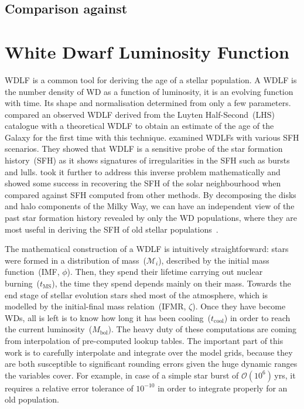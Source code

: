 \documentclass[fleqn,usenatbib]{rasti}
\begin{document}
\subsection{Comparison against \citet{2021MNRAS.508.3877G}}




\section{White Dwarf Luminosity Function}
WDLF is a common tool for deriving the age of a stellar population. A WDLF is
the number density of WD as a function of luminosity, it is an evolving
function with time. Its shape and normalisation determined from only a few
parameters. \citet{1987ApJ...315L..77W} compared an observed WDLF derived from
the Luyten Half-Second~(LHS) catalogue with a theoretical WDLF to obtain an
estimate of the age of the Galaxy for the first time with this technique.
\citet{1990ApJ...352..605N} examined WDLFs with various SFH scenarios. They
showed that WDLF is a sensitive probe of the star formation history~(SFH) as
it shows signatures of irregularities in the SFH such as bursts and lulls.
\citet{2013MNRAS.434.1549R} took it further to address this inverse problem
mathematically and showed some success in recovering the SFH of the solar
neighbourhood when compared against SFH computed from other methods. By
decomposing the disks and halo components of the Milky Way, we can have an
independent view of the past star formation history revealed by only the
WD populations, where they are most useful in deriving the SFH of old
stellar populations~\citep{2011MNRAS.417...93R, 2017ASPC..509...25L}.


The mathematical construction of a WDLF is intuitively straightforward: stars
were formed in a distribution of mass~($\mathcal{M}_i$), described by the initial
mass function~(IMF, $\phi$). Then, they spend their lifetime carrying out
nuclear burning~($t_{\mathrm{MS}}$), the time they spend depends mainly on
their mass. Towards the end stage of stellar evolution stars shed most of the
atmosphere, which is modelled by the initial-final mass relation~(IFMR,
$\zeta$). Once they have become WDs, all is left is to know how long it has
been cooling~($t_{\mathrm{cool}}$) in order to reach the current
luminosity~($M_\mathrm{bol}$). The heavy duty of these computations
are coming from interpolation of pre-computed lookup tables. The important
part of this work is to carefully interpolate and integrate over the model
grids, because they are both susceptible to significant rounding errors given
the huge dynamic ranges the variables cover. For example, in case of a simple
star burst of $\mathcal{O}(10^6)$\,yrs, it requires a relative error
tolerance of $10^{-10}$ in order to integrate properly for an old population.
\end{document}

